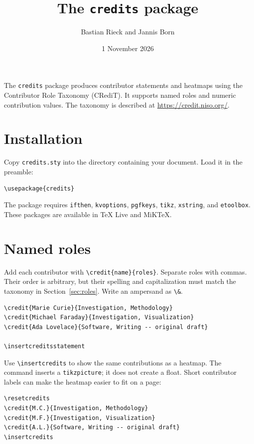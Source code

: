 \documentclass[a4paper,11pt]{article}
\title{The \texttt{credits} package}
\author{Bastian Rieck and Jannis Born}
\date{1 November 2026}
\begin{document}
\maketitle

The \texttt{credits} package produces contributor statements and heatmaps
using the Contributor Role Taxonomy (CRediT). It supports named roles and
numeric contribution values. The taxonomy is described at
\url{https://credit.niso.org/}.

\section{Installation}

Copy \texttt{credits.sty} into the directory containing your document.
Load it in the preamble:
\begin{verbatim}
\usepackage{credits}
\end{verbatim}
The package requires \texttt{ifthen}, \texttt{kvoptions}, \texttt{pgfkeys},
\texttt{tikz}, \texttt{xstring}, and \texttt{etoolbox}. These packages are
available in TeX Live and MiKTeX.

\section{Named roles}

Add each contributor with \verb|\credit{name}{roles}|. Separate roles with
commas. Their order is arbitrary, but their spelling and capitalization
must match the taxonomy in Section~\ref{sec:roles}. Write an ampersand as
\verb|\&|.

\begin{verbatim}
\credit{Marie Curie}{Investigation, Methodology}
\credit{Michael Faraday}{Investigation, Visualization}
\credit{Ada Lovelace}{Software, Writing -- original draft}

\insertcreditsstatement
\end{verbatim}

\noindent\insertcreditsstatement

\medskip
Use \verb|\insertcredits| to show the same contributions as a heatmap.
The command inserts a \texttt{tikzpicture}; it does not create a float.
Short contributor labels can make the heatmap easier to fit on a page:

\begin{verbatim}
\resetcredits
\credit{M.C.}{Investigation, Methodology}
\credit{M.F.}{Investigation, Visualization}
\credit{A.L.}{Software, Writing -- original draft}
\insertcredits
\end{verbatim}
\end{document}

